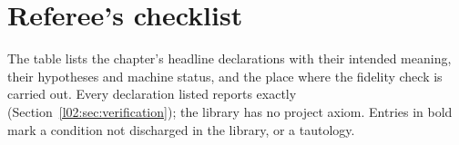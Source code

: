\section{Referee's checklist}\label{l02:sec:checklist}

The table lists the chapter's headline declarations with their intended meaning, their hypotheses
and machine status, and the place where the fidelity check is carried out. Every declaration listed
reports exactly  (Section~\ref{l02:sec:verification}); the
library has no project axiom. Entries in bold mark a condition not discharged in the library, or a
tautology.

\begingroup\small
